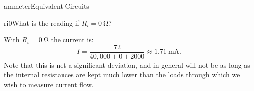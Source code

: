 \begin{mainquestion}{ammeter}{Equivalent Circuits}
\begin{partquestion}{ri0}{What is the reading if $R_{i}=\qty{0}{\ohm}$?}
\begin{answer}
With $R_{i}=\qty{0}{\ohm}$ the current is:
\[
I = \frac{72}{40{,}000 + 0 + 2000} \approx \qty{1.71}{\milli\ampere}.
\]
Note that this is not a significant deviation, and in general will not be as long as the internal resistances are kept much lower than the loads through which we wish to measure current flow.
\end{answer}
\end{partquestion}

\end{mainquestion}
